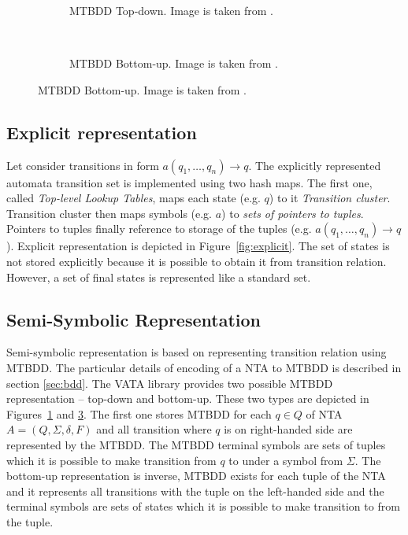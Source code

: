 \documentclass[a4paper, 12pt]{article}
\begin{document}
\begingroup
{}%
\begin{figure}[h]
	\centering
	\begin{subfigure}{.5\textwidth}
		\centering
		
		\caption{MTBDD Top-down. Image is taken from \cite{libvata}.}
		\label{fig:mtbdd_td}
	\end{subfigure}%
	~
	\begin{subfigure}{.5\textwidth}
	\centering
	
	\caption{MTBDD Bottom-up. Image is taken from \cite{libvata}.}
	\label{fig:mtbdd_bu}
	\end{subfigure}%
\end{figure}
\endgroup

\subsection{Explicit representation}

Let consider transitions in form $a(q_1,\ldots,q_n) \rightarrow q$.
The explicitly represented automata transition set is implemented using two hash maps.
The first one, called \emph{Top-level Lookup Tables}, maps each state (e.g. $q$) to it \emph{Transition cluster}.
Transition cluster then maps symbols (e.g. $a$) to \emph{sets of pointers to tuples}.
Pointers to tuples finally reference to storage of the tuples (e.g. $a(q_1,\ldots,q_n) \rightarrow q$).
Explicit representation is depicted in Figure~\ref{fig:explicit}.
The set of states is not stored explicitly because it is possible to obtain it from transition relation.
However, a set of final states is represented like a standard set.

\subsection{Semi-Symbolic Representation}

Semi-symbolic representation is based on representing transition relation using MTBDD.
The particular details of encoding of a NTA to MTBDD is described in section \ref{sec:bdd}.
The VATA library provides two possible MTBDD representation -- top-down and bottom-up. These two types are depicted in Figures~\ref{fig:mtbdd_td} and \ref{fig:mtbdd_bu}. 
The first one stores MTBDD for each $q \in Q$ of NTA $A=(Q,\Sigma, \delta, F)$ and all transition where $q$ is on right-handed side
are represented by the MTBDD.
The MTBDD terminal symbols are sets of tuples which it is possible to make transition from $q$ to under a symbol from $\Sigma$.
The bottom-up representation is inverse, MTBDD exists for each tuple of the NTA and it represents all transitions with
the tuple on the left-handed side and the terminal symbols are sets of states which it is possible to make transition to from the tuple.
\end{document}
